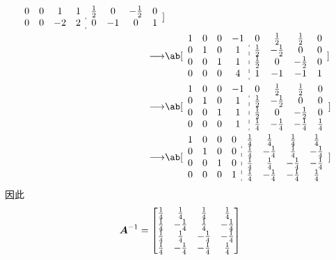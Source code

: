 \begin{problem}
\begin{solution}
\begin{itemize}
$$\begin{aligned}
\begin{array}{cccc:cccc}
					0 & 0 & 1 & 1 & \frac{1}{2} & 0 & -\frac{1}{2} & 0 \\
					0 & 0 & -2 & 2 & 0 & -1 & 0 & 1
				\end{array}] \\
				\longrightarrow & \ab[\begin{array}{cccc:cccc}
					1 & 0 & 0 & -1 & 0 & \frac{1}{2} & \frac{1}{2} & 0 \\
					0 & 1 & 0 & 1 & \frac{1}{2} & -\frac{1}{2} & 0 & 0 \\
					0 & 0 & 1 & 1 & \frac{1}{2} & 0 & -\frac{1}{2} & 0 \\
					0 & 0 & 0 & 4 & 1 & -1 & -1 & 1
				\end{array}] \\
				\longrightarrow & \ab[\begin{array}{cccc:cccc}
					1 & 0 & 0 & -1 & 0 & \frac{1}{2} & \frac{1}{2} & 0 \\
					0 & 1 & 0 & 1 & \frac{1}{2} & -\frac{1}{2} & 0 & 0 \\
					0 & 0 & 1 & 1 & \frac{1}{2} & 0 & -\frac{1}{2} & 0 \\
					0 & 0 & 0 & 1 & \frac{1}{4} & -\frac{1}{4} & -\frac{1}{4} & \frac{1}{4}
				\end{array}] \\
				\longrightarrow & \ab[\begin{array}{cccc:cccc}
					1 & 0 & 0 & 0 & \frac{1}{4} & \frac{1}{4} & \frac{1}{4} & \frac{1}{4} \\
					0 & 1 & 0 & 0 & \frac{1}{4} & -\frac{1}{4} & \frac{1}{4} & -\frac{1}{4} \\
					0 & 0 & 1 & 0 & \frac{1}{4} & \frac{1}{4} & -\frac{1}{4} & -\frac{1}{4} \\
					0 & 0 & 0 & 1 & \frac{1}{4} & -\frac{1}{4} & -\frac{1}{4} & \frac{1}{4}
				\end{array}] \\
			\end{aligned}
			$$
			因此
			$$
			\boldsymbol{A}^{-1} = \begin{bmatrix}
				\frac{1}{4} & \frac{1}{4} & \frac{1}{4} & \frac{1}{4} \\
				\frac{1}{4} & -\frac{1}{4} & \frac{1}{4} & -\frac{1}{4} \\
				\frac{1}{4} & \frac{1}{4} & -\frac{1}{4} & -\frac{1}{4} \\
				\frac{1}{4} & -\frac{1}{4} & -\frac{1}{4} & \frac{1}{4}
			\end{bmatrix}
			$$


\end{itemize}
\end{solution}
\end{problem}
